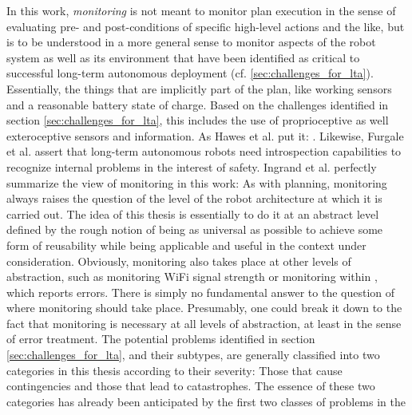 \documentclass[english, master, utf8]{base/thesis_KBS}
\newcommand{\code}{\collectverb{\codebox}}
\begin{document}
In this work, \textit{monitoring} is not meant to monitor plan execution in the sense of evaluating
pre- and post-conditions of specific high-level actions and the like, but is to be understood in a more general sense to monitor aspects of the robot system as well as its environment
that have been identified as critical to successful long-term autonomous deployment (cf. \ref{sec:challenges_for_lta}). Essentially, the things that are implicitly part of the plan,
like working sensors and a reasonable battery state of charge. \cite{Ingrand:2017} Based on the challenges identified in section \ref{sec:challenges_for_lta}, this includes the use of
proprioceptive as well exteroceptive sensors and information. As Hawes et al. put it: . \cite{Hawes:2017} Likewise, Furgale et al. assert that long-term autonomous robots need introspection capabilities to recognize internal problems in
the interest of safety. \cite{Furgale:2015} Ingrand et al. perfectly summarize the view of monitoring in this work:  \cite{Ingrand:2017}
As with planning, monitoring always raises the question of the level of the robot architecture at which it is carried out. The idea of this thesis is essentially to do it at an abstract level
defined by the rough notion of being as universal as possible to achieve some form of reusability while being applicable and useful in the context under consideration. Obviously,
monitoring also takes place at other levels of abstraction, such as monitoring WiFi signal strength or monitoring within \code{move_base_flex}, which reports errors. There is simply
no fundamental answer to the question of where monitoring should take place. Presumably, one could break it down to the fact that monitoring is necessary at all levels of abstraction,
at least in the sense of error treatment.
The potential problems identified in section \ref{sec:challenges_for_lta}, and their subtypes, are generally classified into two categories in this thesis according to their severity:
Those that cause contingencies and those that lead to catastrophes. The essence of these two categories has already been anticipated by the first two classes of problems in the
\end{document}
